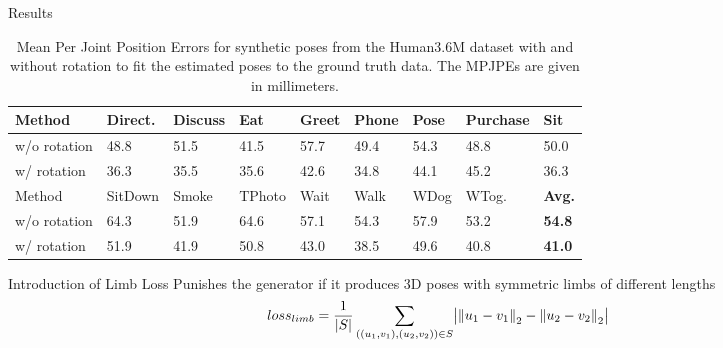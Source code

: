 \documentclass[8pt]{beamer}
\begin{document}
	\begin{frame}{Results}
		\begin{table}
			\centering
			\begin{tabularx}{\textwidth}{l *{8}{Y}}
				\toprule
				Method & Direct. & Discuss & Eat & Greet & Phone & Pose & Purchase & Sit \\
				\midrule
				w/o rotation & 48.8 & 51.5 & 41.5 & 57.7 & 49.4 & 54.3 & 48.8 & 50.0 \\
				w/ rotation & 36.3 & 35.5 & 35.6 & 42.6 & 34.8 & 44.1 & 45.2 & 36.3 \\
				\bottomrule
				\toprule
				Method & SitDown & Smoke & TPhoto & Wait & Walk & WDog & WTog. & \textbf{Avg.}\\
				\midrule
				w/o rotation & 64.3 & 51.9 & 64.6 & 57.1 & 54.3 & 57.9 & 53.2 & \textbf{54.8} \\
				w/ rotation  & 51.9 & 41.9 & 50.8 & 43.0 & 38.5 & 49.6 & 40.8 & \textbf{41.0} \\
				\bottomrule
			\end{tabularx}
		\caption{Mean Per Joint Position Errors for synthetic poses from the Human3.6M dataset with and without rotation to fit the estimated poses to the ground truth data. The MPJPEs are given in millimeters.}
		\end{table}
	\end{frame}
	
	\begin{frame}{Introduction of Limb Loss}
		Punishes the generator if it produces 3D poses with symmetric limbs of different lengths
		\vspace{2em}
		\begin{equation*}
			loss_{limb} = \frac{1}{|S|}\sum_{((u_1, v_1), (u_2, v_2)) \in S} \bigl\lvert \norm{u_1 - v_1}_2 - \norm{u_2 - v_2}_2 \bigr\rvert
		\end{equation*}		
	\end{frame}
\end{document}
